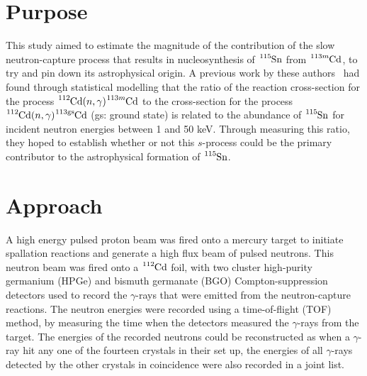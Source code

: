 \documentclass[12pt,a4paper]{article}
\begin{document}
\section*{Purpose}
This study aimed to estimate the magnitude of the contribution of the slow neutron-capture process that results in nucleosynthesis of $\ce{^{115}Sn}$ from $\ce{^{113m}Cd}$, to try and pin down its astrophysical origin. A previous work by these authors~\cite{hayakawa_neutron_2009} had found through statistical modelling that the ratio of the reaction cross-section for the process $\ce{^{112}Cd}(n,\gamma)\ce{^{113m}Cd}$ to the cross-section for the process $\ce{^{112}Cd}(n,\gamma)\ce{^{113gs}Cd}$ (gs: ground state) is related to the abundance of $\ce{^{115}Sn}$ for incident neutron energies between 1 and 50 keV. Through measuring this ratio, they hoped to establish whether or not this $s$-process could be the primary contributor to the astrophysical formation of $\ce{^{115}Sn}$.


\section*{Approach}
A high energy pulsed proton beam was fired onto a mercury target to initiate spallation reactions and generate a high flux beam of pulsed neutrons. This neutron beam was fired onto a $\ce{^{112}Cd}$ foil, with two cluster high-purity germanium (HPGe) and bismuth germanate (BGO) Compton-suppression detectors used to record the $\gamma$-rays that were emitted from the neutron-capture reactions. The neutron energies were recorded using a time-of-flight (TOF) method, by measuring the time when the detectors measured the $\gamma$-rays from the target. The energies of the recorded neutrons could be reconstructed as when a $\gamma$-ray hit any one of the fourteen crystals in their set up, the energies of all $\gamma$-rays detected by the other crystals in coincidence were also recorded in a joint list. 

\end{document}

